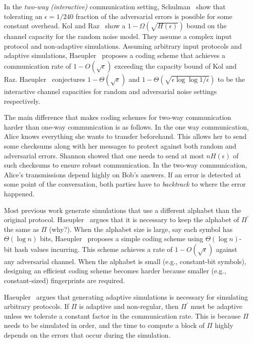 \documentclass[10pt]{article}
\theoremstyle{plain}
\begin{document}
In the \emph{two-way (interactive) }communication setting, Schulman~\cite{Schulman:1996}
show that tolerating an $\epsilon=1/240$ fraction of the adversarial
errors is possible for some constant overhead. Kol and Raz~\cite{Kol:2013:ICC:2488608.2488699}
show a $1-\Omega(\sqrt{H(\epsilon)})$ bound on the channel capacity
for the random noise model. They assume a complex input protocol and
non-adaptive simulations. Assuming arbitrary input protocols and adaptive
simulations, Haeupler~\cite{DBLP:journals/corr/Haeupler14} proposes
a coding scheme that achieves a communication rate of $1-O(\sqrt{\epsilon})$
exceeding the capacity bound of Kol and Raz. Haeupler~\cite{DBLP:journals/corr/Haeupler14}
conjectures $1-\Theta(\sqrt{\epsilon})$ and $1-\Theta(\sqrt{\epsilon\log\log1/\epsilon})$
to be the interactive channel capacities for random and adversarial
noise settings respectively.

The main difference that makes coding schemes for two-way communication
harder than one-way communication is as follows. In the one way communication,
Alice knows everything she wants to transfer beforehand. This allows
her to send some checksums along with her messages to protect against
both random and adversarial errors. Shannon showed that one needs
to send at most $nH(\epsilon)$ of such checksums to ensure robust
communication. In the two-way communication, Alice's transmissions
depend highly on Bob's answers. If an error is detected at some point
of the conversation, both parties have to \emph{backtrack} to where
the error happened.

Most previous work generate simulations that use a different alphabet
than the original protocol. Haeupler~\cite{DBLP:journals/corr/Haeupler14}
argues that it is necessary to keep the alphabet of $\Pi^{\prime}$
the same as $\Pi$ (why?). When the alphabet size is large, say each
symbol has $\Theta(\log n)$ bits, Haeupler~\cite{DBLP:journals/corr/Haeupler14}
proposes a simple coding scheme using $\Theta(\log n)$-bit hash values
incurring. This scheme achieves a rate of $1-O(\sqrt{\epsilon})$
against any adversarial channel. When the alphabet is small (e.g.,
constant-bit symbols), designing an efficient coding scheme becomes
harder because smaller (e.g., constant-sized) fingerprints are required.

Haeupler~\cite{DBLP:journals/corr/Haeupler14} argues that generating
adaptive simulations is necessary for simulating arbitrary protocols.
If $\Pi$ is adaptive and non-regular, then $\Pi^{\prime}$ must be
adaptive unless we tolerate a constant factor in the communication
rate. This is because $\Pi$ needs to be simulated in order, and the
time to compute a block of $\Pi$ highly depends on the errors that
occur during the simulation.
\end{document}
